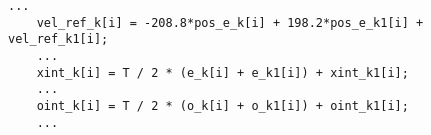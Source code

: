\begin{lstlisting}[style=customcpp,
caption={Code for the controllers.}, 
label=lst:scheduler]
    ...
    vel_ref_k[i] = -208.8*pos_e_k[i] + 198.2*pos_e_k1[i] + vel_ref_k1[i];
    ...
    xint_k[i] = T / 2 * (e_k[i] + e_k1[i]) + xint_k1[i];
    ...
    oint_k[i] = T / 2 * (o_k[i] + o_k1[i]) + oint_k1[i];
    ...

\end{lstlisting}